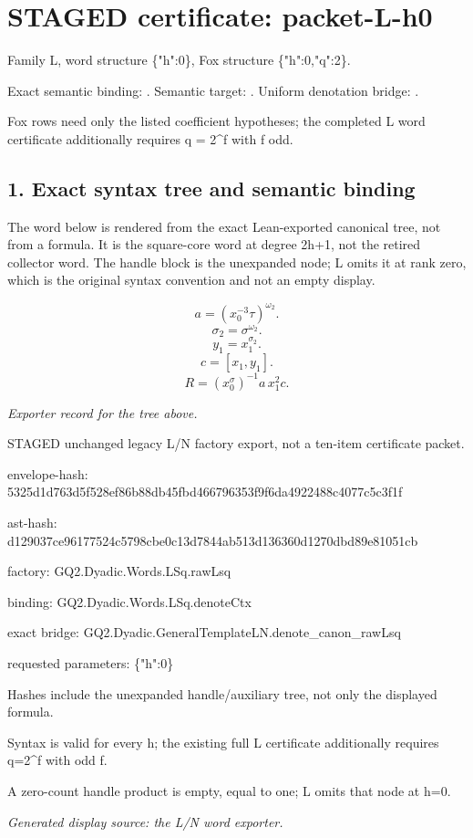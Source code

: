 \section*{STAGED certificate: packet-L-h0}
Family L, word structure \{"h":0\}, Fox structure \{"h":0,"q":2\}.

\noindent Exact semantic binding: . Semantic target: . Uniform denotation bridge: .
\par\noindent Fox rows need only the listed coefficient hypotheses; the completed L word certificate additionally requires q = 2\textasciicircum{}f with f odd.

\subsection*{1. Exact syntax tree and semantic binding}
The word below is rendered from the exact Lean-exported canonical tree, not from a formula. It is the square-core word at degree 2h+1, not the retired collector word. The handle block is the unexpanded node; L omits it at rank zero, which is the original syntax convention and not an empty display.

\[a=(x_0^{-3}\tau)^{\omega_2}.\]
\[\sigma_2=\sigma^{\omega_2}.\]
\[y_1=x_1^{\sigma_2}.\]
\[c=[x_1,y_1].\]
\[R=(x_0^\sigma)^{-1}a\,x_1^2c.\]
\par\noindent\emph{Exporter record for the tree above.}
\par\noindent STAGED unchanged legacy L/N factory export, not a ten-item certificate packet.
\par\noindent envelope-hash: 5325d1d763d5f528ef86b88db45fbd466796353f9f6da4922488c4077c5c3f1f
\par\noindent ast-hash: d129037ce96177524c5798cbe0c13d7844ab513d136360d1270dbd89e81051cb
\par\noindent factory: GQ2.Dyadic.Words.LSq.rawLsq
\par\noindent binding: GQ2.Dyadic.Words.LSq.denoteCtx
\par\noindent exact bridge: GQ2.Dyadic.GeneralTemplateLN.denote\_canon\_rawLsq
\par\noindent requested parameters: \{"h":0\}
\par\noindent Hashes include the unexpanded handle/auxiliary tree, not only the displayed formula.
\par\noindent Syntax is valid for every h; the existing full L certificate additionally requires q=2\textasciicircum{}f with odd f.
\par\noindent A zero-count handle product is empty, equal to one; L omits that node at h=0.
\par\noindent\emph{Generated display source: the L/N word exporter.}
